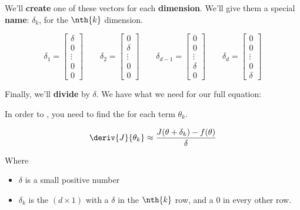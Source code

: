         We'll \textbf{create} one of these vectors for each \textbf{dimension}. We'll give them a special \textbf{name}: $\delta_k$, for the $\nth{k}$ dimension.
        
        \begin{equation}
            \delta_1 
            = 
            \begin{bmatrix}
                \delta \\ 0 \\ \vdots\\ 0 \\ 0
            \end{bmatrix}
            \qquad
            \delta_2 
            = 
            \begin{bmatrix}
                0 \\ \delta \\ \vdots\\ 0 \\ 0
            \end{bmatrix}
            \qquad
            \delta_{d-1} 
            = 
            \begin{bmatrix}
                0 \\ 0 \\ \vdots\\ \delta \\ 0
            \end{bmatrix}
            \qquad
            \delta_{d} 
            = 
            \begin{bmatrix}
                0 \\ 0 \\ \vdots\\ 0 \\ \delta
            \end{bmatrix}
        \end{equation}
        
        Finally, we'll \textbf{divide} by $\delta$. We have what we need for our full equation:\\
        
        \begin{kequation}
            In order to , you need to find the  for each term $\theta_k$.
            
            \begin{equation*}
                \deriv{J}{\theta_k} \approx
                \frac{J(\theta+\delta_k)-f(\theta)}{\delta}
            \end{equation*}
            
            Where 
            
            \begin{itemize}
                \item $\delta$ is a small positive number
                \item $\delta_k$ is the $(d \times 1)$  with a $\delta$ in the $\nth{k}$ row, and a 0 in every other row.
            \end{itemize} 
        \end{kequation}

